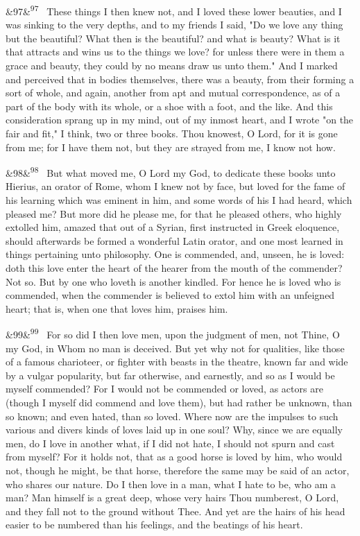 \documentclass[12pt]{article}
\newcommand{\para}[1][]{\par\noindent\ifx&#1&\else\textsuperscript{\footnotesize #1}~\fi}
\begin{document}
\para[97] These things I then knew not, and I loved these lower beauties, and I was sinking to the very depths, and to my friends I said, "Do we love any thing but the beautiful? What then is the beautiful? and what is beauty? What is it that attracts and wins us to the things we love? for unless there were in them a grace and beauty, they could by no means draw us unto them." And I marked and perceived that in bodies themselves, there was a beauty, from their forming a sort of whole, and again, another from apt and mutual correspondence, as of a part of the body with its whole, or a shoe with a foot, and the like. And this consideration sprang up in my mind, out of my inmost heart, and I wrote "on the fair and fit," I think, two or three books. Thou knowest, O Lord, for it is gone from me; for I have them not, but they are strayed from me, I know not how.

\para[98] But what moved me, O Lord my God, to dedicate these books unto Hierius, an orator of Rome, whom I knew not by face, but loved for the fame of his learning which was eminent in him, and some words of his I had heard, which pleased me? But more did he please me, for that he pleased others, who highly extolled him, amazed that out of a Syrian, first instructed in Greek eloquence, should afterwards be formed a wonderful Latin orator, and one most learned in things pertaining unto philosophy. One is commended, and, unseen, he is loved: doth this love enter the heart of the hearer from the mouth of the commender? Not so. But by one who loveth is another kindled. For hence he is loved who is commended, when the commender is believed to extol him with an unfeigned heart; that is, when one that loves him, praises him.

\para[99] For so did I then love men, upon the judgment of men, not Thine, O my God, in Whom no man is deceived. But yet why not for qualities, like those of a famous charioteer, or fighter with beasts in the theatre, known far and wide by a vulgar popularity, but far otherwise, and earnestly, and so as I would be myself commended? For I would not be commended or loved, as actors are (though I myself did commend and love them), but had rather be unknown, than so known; and even hated, than so loved. Where now are the impulses to such various and divers kinds of loves laid up in one soul? Why, since we are equally men, do I love in another what, if I did not hate, I should not spurn and cast from myself? For it holds not, that as a good horse is loved by him, who would not, though he might, be that horse, therefore the same may be said of an actor, who shares our nature. Do I then love in a man, what I hate to be, who am a man? Man himself is a great deep, whose very hairs Thou numberest, O Lord, and they fall not to the ground without Thee. And yet are the hairs of his head easier to be numbered than his feelings, and the beatings of his heart.
\end{document}
